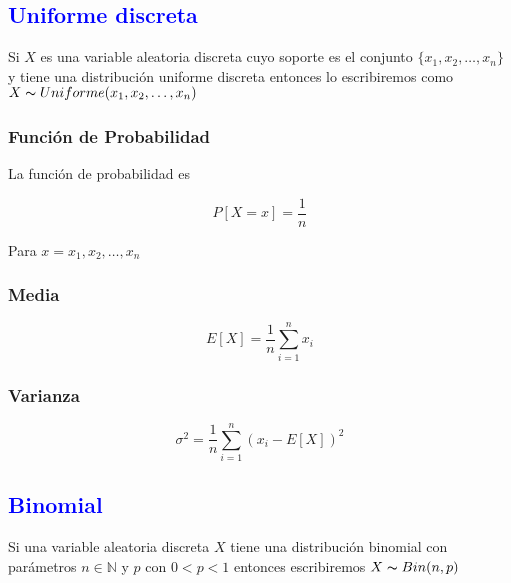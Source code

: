 \documentclass{article}
\begin{document}
\begin{multicols}{2}
                
        \subsection{\textcolor{blue}{Uniforme discreta}}

                Si $X$ es una variable aleatoria discreta cuyo soporte es el conjunto $\{ x_1,x_2,\ldots , x_n \}$ y tiene una distribución uniforme discreta entonces lo escribiremos como $X\thicksim Uniforme (x_1,x_2,\ldots , x_n)$
                
            \subsubsection{Función de Probabilidad}

                La función de probabilidad es

                    \begin{equation*}
                        P[X=x] = \frac{1}{n}
                    \end{equation*}

                Para $x=x_1,x_2,\ldots , x_n$ 

            \subsubsection{Media}

                \begin{equation*}
                    E[X] = \frac{1}{n} \sum _{i=1}^n x_i
                \end{equation*}
                
            \subsubsection{Varianza}

                \begin{equation*}
                    \sigma ^2 = \frac{1}{n} \sum_{i=1}^n (x_i-E[X])^2
                \end{equation*}
            
        \subsection{\textcolor{blue}{Binomial}}

            Si una variable aleatoria discreta $X$ tiene una distribución binomial con parámetros $n\in \mathbb{N}$ y $p$ con $0<p<1$ entonces escribiremos $X\thicksim Bin (n,p)$


\end{multicols}
\end{document}
